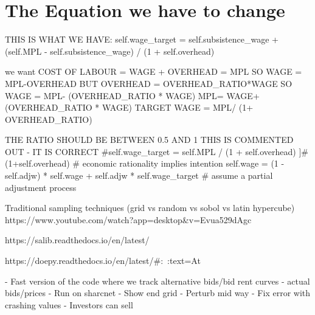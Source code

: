 \section{The Equation we have to change}
THIS IS WHAT WE HAVE:
 self.wage_target = self.subsistence_wage + (self.MPL - self.subsistence_wage) / (1 + self.overhead)       


we want COST OF LABOUR = WAGE + OVERHEAD = MPL 
SO 
WAGE = MPL-OVERHEAD
BUT
OVERHEAD =  OVERHEAD_RATIO*WAGE
SO
WAGE = MPL- (OVERHEAD_RATIO * WAGE)
MPL= WAGE+ (OVERHEAD_RATIO * WAGE)
TARGET WAGE = MPL/ (1+ OVERHEAD_RATIO)

THE RATIO SHOULD BE BETWEEN 0.5 AND 1
THIS IS COMMENTED OUT - IT IS CORRECT
 #self.wage_target = self.MPL / (1 + self.overhead) 
 ]# (1+self.overhead) # economic rationality implies intention
        self.wage = (1 - self.adjw) * self.wage + self.adjw * self.wage_target # assume a partial adjustment process
        



Traditional sampling techniques (grid vs random vs sobol vs latin hypercube)
https://www.youtube.com/watch?app=desktop&v=Evua529dAgc


https://salib.readthedocs.io/en/latest/

https://doepy.readthedocs.io/en/latest/#:~:text=At%





- Fast version of the code where we track alternative bids/bid rent curves - actual bids/prices
    - Run on sharcnet
    - Show end grid
- Perturb mid way
- Fix error with crashing values
- Investors can sell

